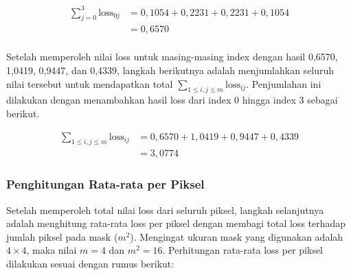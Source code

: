 \begin{align*}
    \sum_{j=0}^{3}\text{loss}_{0j} &= 0{,}1054 + 0{,}2231 + 0{,}2231 + 0{,}1054 \\
     &= 0{,}6570 \\
\end{align*}




Setelah memperoleh nilai loss untuk masing-masing index dengan hasil 0{,}6570, 1{,}0419, 0{,}9447, dan 0{,}4339, langkah berikutnya adalah menjumlahkan seluruh nilai tersebut untuk mendapatkan total $\sum_{1 \leq i,j \leq m}{\text{loss}_{ij}}$. Penjumlahan ini dilakukan dengan menambahkan hasil loss dari index 0 hingga index 3 sebagai berikut. \par

\begin{align*}
    \sum_{1 \leq i,j \leq m}{\text{loss}_{ij}} &= 0,6570 + 1,0419 + 0,9447 + 0,4339 \\
     &= 3,0774 
\end{align*}

\subsubsection{Penghitungan Rata-rata per Piksel}

Setelah memperoleh total nilai loss dari seluruh piksel, langkah selanjutnya adalah menghitung rata-rata loss per piksel dengan membagi total loss terhadap jumlah piksel pada mask ($m^2$). Mengingat ukuran mask yang digunakan adalah $4 \times 4$, maka nilai $m = 4$ dan $m^2 = 16$. Perhitungan rata-rata loss per piksel dilakukan sesuai dengan rumus berikut:

